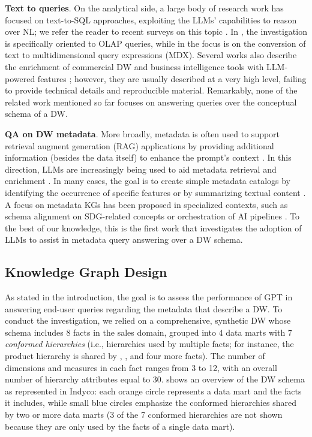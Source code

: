 \textbf{Text to queries}. On the analytical side, a large body of research work has focused on text-to-SQL approaches, exploiting the LLMs' capabilities to reason over NL; we refer the reader to recent surveys on this topic \cite{DBLP:journals/tkde/HongYZCDHH25,DBLP:journals/tkde/LiuSLMJZFLTL25}. In \cite{petkovic2025applying}, the investigation is specifically oriented to OLAP queries, while in \cite{DBLP:conf/er/BimonteR25} the focus is on the conversion of text to multidimensional query expressions (MDX).
Several works also describe the enrichment of commercial DW and business intelligence tools with LLM-powered features \cite{sridharan2025toward,jiang2024siriusbi}; however, they are usually described at a very high level, failing to provide technical details and reproducible material. Remarkably, none of the related work mentioned so far focuses on answering queries over the conceptual schema of a DW.

\textbf{QA on DW metadata}. More broadly, metadata is often used to support retrieval augment generation (RAG) applications by providing additional information (besides the data itself) to enhance the prompt's context \cite{hayashi2024metadata}. In this direction, LLMs are increasingly being used to aid metadata retrieval and enrichment \cite{yang2025impact}. In many cases, the goal is to create simple metadata catalogs by identifying the occurrence of specific features or by summarizing textual content \cite{DBLP:conf/ease/SunJS25,madupati2025ai,DBLP:conf/data/BuschTV25,tinn2025pre,DBLP:conf/sds3/HoseiniBPMQP24}. A focus on metadata KGs has been proposed in specialized contexts, such as schema alignment on SDG-related concepts \cite{DBLP:journals/corr/abs-2505-13557} or orchestration of AI pipelines \cite{venkataramanan2025constructing}. To the best of our knowledge, this is the first work that investigates the adoption of LLMs to assist in metadata query answering over a DW schema.

\subsection{Knowledge Graph Design}
\label{sec:llm-kgd}

As stated in the introduction, the goal is to assess the performance of GPT in answering end-user queries regarding the metadata that describe a DW.
To conduct the investigation, we relied on a comprehensive, synthetic DW whose schema includes 8 facts in the sales domain, grouped into 4 data marts with 7 \emph{conformed hierarchies} (i.e., hierarchies used by multiple facts; for instance, the product hierarchy is shared by , , and four more facts). The number of dimensions and measures in each fact ranges from 3 to 12, with an overall number of hierarchy attributes equal to 30.  shows an overview of the DW schema as represented in Indyco: each orange circle represents a data mart and the facts it includes, while small blue circles emphasize the conformed hierarchies shared by two or more data marts (3 of the 7 conformed hierarchies are not shown because they are only used by the facts of a single data mart).

